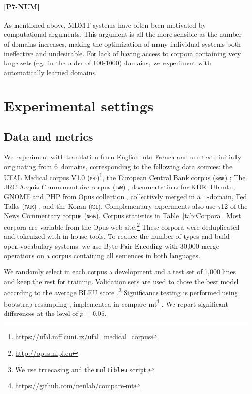 \documentclass[11pt,a4paper]{article}
\newcommand{\fyDone}[1]{\done[FY]\Todo[FY:]{\textcolor{orange}{#1}}}
\newcommand{\fyFuture}[1]{\done[FY]\Todo[FY:]{\textcolor{red}{#1}}}
\newcommand{\domain}[1]{\texttt{\textsc{#1}}}
\begin{document}
\paragraph{[P7-NUM]} As mentioned above, MDMT systems have often been motivated by computational arguments. This argument is all the more sensible as the number of domains increases, making the optimization of many individual systems both ineffective and undesirable. For lack of having access to corpora containing very large sets (eg.\ in the order of 100-1000) domains, we experiment with automatically learned domains.\fyFuture{considering a varying number of clusters.}

\section{Experimental settings \label{sec:experiments}}

\subsection{Data and metrics \label{ssec:corpora}}

We experiment with translation from English into French and use texts initially originating from 6~domains, corresponding to the following data sources: the UFAL Medical corpus V1.0 (\domain{med})\footnote{\url{https://ufal.mff.cuni.cz/ufal_medical_corpus}}, the European Central Bank corpus (\domain{bank}) \cite{Tiedemann12parallel}; The JRC-Acquis Communautaire corpus (\domain{law}) \cite{Steinberger06acquis}, documentations for KDE, Ubuntu, GNOME and PHP from Opus collection \cite{Tiedemann09news}, collectively merged in a \domain{it}-domain, Ted Talks (\domain{talk}) \cite{Cettolo12wit}, and the Koran (\domain{rel}). Complementary experiments also use v12 of the News Commentary corpus (\domain{news}). Corpus statistics in Table~\ref{tab:Corpora}.  Most corpora are variable from the Opus web site.\footnote{\url{http://opus.nlpl.eu}} These corpora were deduplicated and tokenized with in-house tools. To reduce the number of types and build open-vocabulary systems, we use Byte-Pair Encoding \cite{Sennrich16BPE} with 30,000 merge operations on a corpus containing all sentences in both languages.%

We randomly select in each corpus a development and a test set of 1,000 lines and keep the rest for training. Validation sets are used to chose the best model according to the average BLEU score \cite{Papineni02bleu}.\footnote{We use truecasing and the \texttt{multibleu} script.}\fyDone{A word about meta-parameter settings} Significance testing is performed using bootstrap resampling \cite{Koehn04statistical}, implemented in compare-mt\footnote{\url{https://github.com/neulab/compare-mt}} \cite{Neubig19compare-mt}. We report significant differences at the level of $p=0.05$.\fyDone{Fix correct p value}
\end{document}
